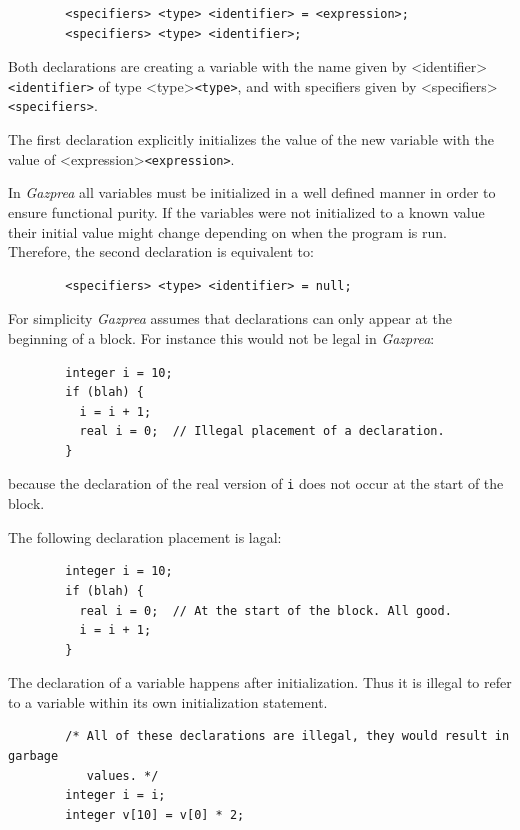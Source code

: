 \documentclass{article}
\begin{document}
	\begin{lstlisting}
		<specifiers> <type> <identifier> = <expression>;
		<specifiers> <type> <identifier>;
	\end{lstlisting}

	Both declarations are creating a variable with the name given by <identifier>\texttt{<identifier>} of type
	<type>\texttt{<type>}, and with specifiers given by <specifiers>\texttt{<specifiers>}.

	The first declaration explicitly initializes the value of the new variable with the value of
	<expression>\texttt{<expression>}.

	In \textit{Gazprea} all variables must be initialized in a well defined manner in order to ensure functional purity.
	If the variables were not initialized to a known value their initial value might change depending on when the
	program is run.  Therefore, the second declaration is equivalent to:

	\begin{lstlisting}
		<specifiers> <type> <identifier> = null;
	\end{lstlisting}

	For simplicity \textit{Gazprea} assumes that declarations can only appear at the beginning of a block. For instance
	this would not be legal in \textit{Gazprea}:

	\begin{lstlisting}
		integer i = 10;
		if (blah) {
		  i = i + 1;
		  real i = 0;  // Illegal placement of a declaration.
		}
	\end{lstlisting}

	because the declaration of the real version of \texttt{i} does not occur at the start of the block.

	The following declaration placement is lagal:

	\begin{lstlisting}
		integer i = 10;
		if (blah) {
		  real i = 0;  // At the start of the block. All good.
		  i = i + 1;
		}
	\end{lstlisting}

	The declaration of a variable happens after initialization. Thus it is illegal to refer to a variable within its own
	initialization statement.

	\begin{lstlisting}
		/* All of these declarations are illegal, they would result in garbage
		   values. */
		integer i = i;
		integer v[10] = v[0] * 2;
	\end{lstlisting}
\end{document}
